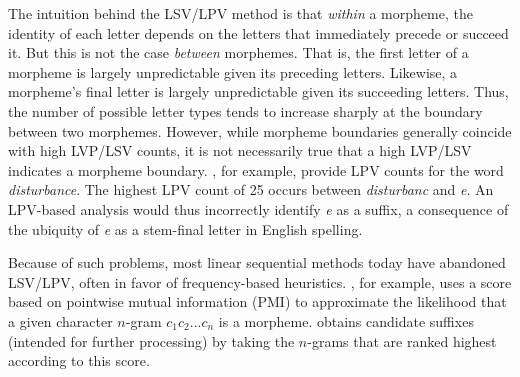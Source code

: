 The intuition behind the LSV/LPV method is that \emph{within} a morpheme, the identity of each letter depends on the letters that immediately precede or succeed it. But this is not the case \emph{between} morphemes. That is, the first letter of a morpheme is largely unpredictable given its preceding letters. Likewise, a morpheme's final letter is largely unpredictable given its succeeding letters. Thus, the number
 of possible letter types tends to increase sharply at the boundary between two morphemes.
However, while morpheme boundaries generally coincide with high LVP/LSV counts, it is not necessarily true that a high LVP/LSV indicates a morpheme boundary.
\cite{hammarstrom:2011}, for example, provide LPV counts for the word \textit{disturbance}. 
The highest LPV count of 25 
occurs between \textit{disturbanc} and \textit{e}.
An LPV-based analysis would thus incorrectly identify \textit{e} as a suffix, a consequence of the ubiquity of \textit{e} as a stem-final letter in English spelling. 

Because of such problems, most linear sequential methods today have abandoned LSV/LPV, often in favor of frequency-based heuristics.
\cite{goldsmith:2001}, for example, uses a score based on pointwise mutual information (PMI) to approximate the likelihood that a given character $n$-gram $c_{1}c_{2}...c_{n}$ is a morpheme. 
\cite{goldsmith:2001} obtains candidate suffixes (intended for further processing) by taking the $n$-grams that are ranked highest according to this score.  


